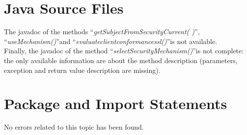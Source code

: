 \documentclass[\mainpath/main]{subfiles}
\begin{document}
\section{Java Source Files}
\label{CodeInspectionChecklist:JaveSourceFiles}
The javadoc of the methods \textquotedblleft \textit{getSubjectFromSecurityCurrent( )}\textquotedblright , \textquotedblleft \textit{useMechanism(\textellipsis)}\textquotedblright  and \textquotedblleft \textit{evaluate\textunderscore client\textunderscore conformance\textunderscore ssl(\textellipsis)}\textquotedblright is not available.\\
Finally, the javadoc of the method \textquotedblleft \textit{selectSecurityMechanism(\textellipsis)}\textquotedblright  is not complete: the only available information are about the method description (parameters, exception and return value description are missing).

\section{Package and Import Statements}
\label{CodeInspectionChecklist:PackageandImportStatements}
No errors related to this topic has been found.
\end{document}
